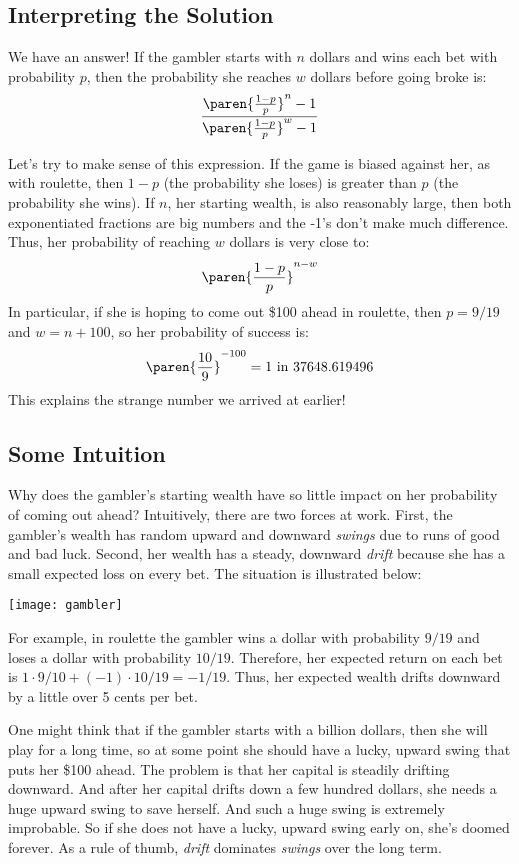 \subsection{Interpreting the Solution}

We have an answer!  If the gambler starts with $n$ dollars and wins
each bet with probability $p$, then the probability she reaches $w$
dollars before going broke is:
%
\[
\frac{\paren{\frac{1-p}{p}}^n-1}{\paren{\frac{1-p}{p}}^w-1}
\]

Let's try to make sense of this expression.  If the game is biased
against her, as with roulette, then $1-p$ (the probability she loses)
is greater than $p$ (the probability she wins).  If $n$, her starting
wealth, is also reasonably large, then both exponentiated fractions
are big numbers and the -1's don't make much difference.  Thus, her
probability of reaching $w$ dollars is very close to:
%
\[
\paren{\frac{1-p}{p}}^{n-w}
\]
%
In particular, if she is hoping to come out \$100 ahead in roulette,
then $p = 9/19$ and $w = n + 100$, so her probability of success is:
%
\[
\paren{\frac{10}{9}}^{-100} = 1 \text{ in } 37648.619496
\]
%
This explains the strange number we arrived at earlier!

\subsection{Some Intuition}

Why does the gambler's starting wealth have so little impact on her
probability of coming out ahead?  Intuitively, there are two forces at
work.  First, the gambler's wealth has random upward and downward
\textit{swings} due to runs of good and bad luck.  Second, her wealth
has a steady, downward \textit{drift} because she has a small expected
loss on every bet.  The situation is illustrated below:
%
\begin{center}
\texttt{[image: gambler]}
\end{center}

For example, in roulette the gambler wins a dollar with probability
$9/19$ and loses a dollar with probability $10/19$.  Therefore, her
expected return on each bet is $1 \cdot 9/10 + (-1) \cdot 10/19 = -
1/19$.  Thus, her expected wealth drifts downward by a little over 5
cents per bet.

One might think that if the gambler starts with a billion dollars,
then she will play for a long time, so at some point she should have a
lucky, upward swing that puts her \$100 ahead.  The problem is that
her capital is steadily drifting downward.  And after her capital
drifts down a few hundred dollars, she needs a huge upward swing to
save herself.  And such a huge swing is extremely improbable.  So if
she does not have a lucky, upward swing early on, she's doomed
forever.  As a rule of thumb, \textit{drift} dominates \textit{swings}
over the long term.

